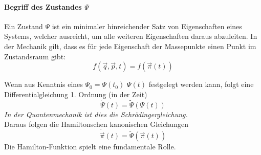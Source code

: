 \documentclass[oneside]{book}
\theoremstyle{definition}
\newcommand{\dotvec}[1]{\dot{\vec{#1}}}
\begin{document}
\paragraph{Begriff des Zustandes $\Psi$}
Ein Zustand $\Psi$ ist ein minimaler hinreichender Satz von Eigenschaften eines Systems, welcher ausreicht, um alle weiteren Eigenschaften daraus abzuleiten. In der Mechanik gilt, dass es für jede Eigenschaft der Massepunkte einen Punkt im Zustandsraum gibt: 
$$f(\vec{q}, \vec{p}, t) = f(\vec{\pi}(t))$$


Wenn aus Kenntnis eines $\Psi_0 = \Psi(t_0)$ $\Psi(t)$ festgelegt werden kann, folgt eine Differentialgleichung 1. Ordnung (in der Zeit)
$$\dot{\Psi}(t) = \tilde{\Psi}(\Psi(t))$$
\textit{In der Quantenmechanik ist dies die Schrödingergleichung.}\\
Daraus folgen die Hamiltonschen kanonischen Gleichungen
$$\dotvec \pi (t) = \tilde{\Psi}(\vec{\pi}(t))$$
Die Hamilton-Funktion spielt eine fundamentale Rolle.

\newcommand{\vpi}{\vec{\pi}}
\newcommand{\poisson}[1]{\{#1\}_{\vec{p}, \vec{q}}}
\end{document}
